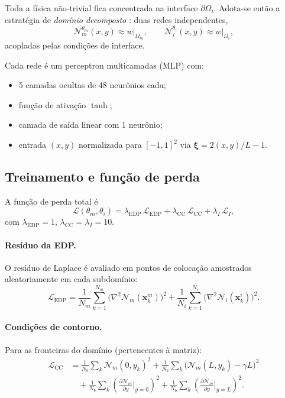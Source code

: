\documentclass[brazil]{TCAM} %
\begin{document}
Toda a física não-trivial fica concentrada na interface $\partial\Omega_i$. Adota-se
então a estratégia de \textit{domínio decomposto} \cite{jagtap2020extended}: duas redes independentes,
\begin{equation*}
    \mathcal{N}_m^{\theta_m}(x,y) \approx w\big|_{\Omega_m}, \qquad
    \mathcal{N}_i^{\theta_i}(x,y) \approx w\big|_{\Omega_i},
\end{equation*}
acopladas pelas condições de interface.

Cada rede é um perceptron multicamadas (MLP) com:
\begin{itemize}
    \item 5 camadas ocultas de 48 neurônios cada;
    \item função de ativação $\tanh$;
    \item camada de saída linear com 1 neurônio;
    \item entrada $(x,y)$ normalizada para $[-1,1]^2$ via
          $\boldsymbol{\xi} = 2(x,y)/L - 1$.
\end{itemize}

\subsection{Treinamento e função de perda}

A função de perda total é
\begin{equation}
    \mathcal{L}(\theta_m, \theta_i)
    = \lambda_{\text{EDP}}\,\mathcal{L}_{\text{EDP}}
    + \lambda_{\text{CC}}\,\mathcal{L}_{\text{CC}}
    + \lambda_{I}\,\mathcal{L}_{I},
\end{equation}
com $\lambda_{\text{EDP}} = 1$, $\lambda_{\text{CC}} = \lambda_I = 10$.

\paragraph{Resíduo da EDP.}
O resíduo de Laplace é avaliado em pontos de colocação amostrados
aleatoriamente em cada subdomínio:
\begin{equation}
    \mathcal{L}_{\text{EDP}}
    = \frac{1}{N_m}\sum_{k=1}^{N_m}
      \bigl(\nabla^2 \mathcal{N}_m(\mathbf{x}_k^m)\bigr)^2
    + \frac{1}{N_i}\sum_{k=1}^{N_i}
      \bigl(\nabla^2 \mathcal{N}_i(\mathbf{x}_k^i)\bigr)^2.
\end{equation}

\paragraph{Condições de contorno.}
Para as fronteiras do domínio (pertencentes à matriz):
\begin{equation}
\begin{aligned}
    \mathcal{L}_{\text{CC}}
    &= \frac{1}{N_b}\sum_k \mathcal{N}_m(0,y_k)^2
    + \frac{1}{N_b}\sum_k \bigl(\mathcal{N}_m(L,y_k)-\gamma L\bigr)^2 \\
    &\quad
    + \frac{1}{N_b}\sum_k \left(\frac{\partial \mathcal{N}_m}{\partial y}
      \bigg|_{y=0}\right)^2
    + \frac{1}{N_b}\sum_k \left(\frac{\partial \mathcal{N}_m}{\partial y}
      \bigg|_{y=L}\right)^2.
\end{aligned}
\end{equation}
\end{document}
